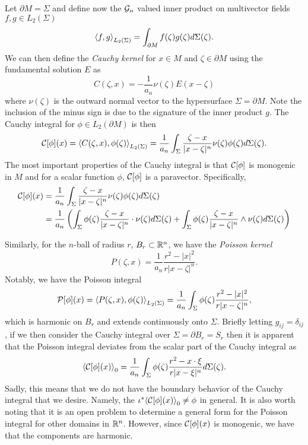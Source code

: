 \documentclass[12pt]{article}
\begin{document}
Let $\partial M = \Sigma$ and define now the $\G_n$ valued inner product on multivector fields $f,g \in L_2(\Sigma)$
\[
\innerproduct{f}{g} = \int_{\partial M} f(\zeta)g(\zeta)d\Sigma(\zeta).
\]
We can then define the \emph{Cauchy kernel} for $x\in M$ and $\zeta \in \partial M$ using the fundamental solution $E$ as
\[
C(\zeta, x) = -\frac{1}{a_n} \nu(\zeta) E(x-\zeta)
\]
where $\nu(\zeta)$ is the outward normal vector to the hypersurface $\Sigma = \partial M$. Note the inclusion of the minus sign is due to the signature of the inner product $g$. The Cauchy integral for $\phi \in L_2(\partial M)$ is then
\[
\cauchy[\phi](x) = \innerproduct{C(\zeta,x)}{\phi(\zeta)} =\frac{1}{a_n} \int_{\Sigma} \frac{\zeta-x}{|x-\zeta|^n} \nu(\zeta) \phi(\zeta) d\Sigma(\zeta).
\]
The most important properties of the Cauchy integral is that $\cauchy[\phi]$ is monogenic in $M$ and for a scalar function $\phi$, $\cauchy[\phi]$ is a paravector.  Specifically,
\begin{align*}
\cauchy[\phi](x) &= \frac{1}{a_n} \int_{\Sigma} \frac{\zeta-x}{|x-\zeta|^n} \nu(\zeta) \phi(\zeta) d\Sigma(\zeta)\\
&= \frac{1}{a_n} \left(\int_{\Sigma} \phi(\zeta) \frac{\zeta-x}{|x-\zeta|^n} \cdot \nu(\zeta) d\Sigma(\zeta) + \int_{\Sigma} \phi(\zeta) \frac{\zeta-x}{|x-\zeta|^n} \wedge \nu(\zeta) d\Sigma(\zeta)\right)
\end{align*}

Similarly, for the $n$-ball of radius $r$, $B_r \subset \R^n$, we have the \emph{Poisson kernel}
\[
P(\zeta,x) = \frac{1}{a_n}\frac{r^2-|x|^2}{r|x-\zeta|^n}.
\]
Notably, we have the Poisson integral
\[
\poisson[\phi](x) = \innerproduct{P(\zeta,x)}{\phi(\zeta)} = \frac{1}{a_n} \int_\Sigma \phi(\zeta) \frac{r^2-|x|^2}{r|x-\zeta|^n},
\]
which is harmonic on $B_r$ and extends continuously onto $\Sigma$. Briefly letting $g_{ij}=\delta_{ij}$, if we then consider the Cauchy integral over $\Sigma = \partial B_r = S_r$ then it is apparent that the Poisson integral deviates from the scalar part of the Cauchy integral as
\[
\proj{0}{\cauchy[\phi](x)} = \frac{1}{a_n} \int_\Sigma \phi(\zeta) \frac{r^2- x\cdot \xi}{r|x-\xi|^n} d\Sigma (\zeta).
\]
Sadly, this means that we do not have the boundary behavior of the Cauchy integral that we desire.  Namely, the $\iota^* \proj{0}{\cauchy[\phi](x)}\neq \phi$ in general. It is also worth noting that it is an open problem to determine a general form for the Poisson integral for other domains in $\R^n$. However, since $\cauchy[\phi](x)$ is monogenic, we have that the components are harmonic.
\end{document}
